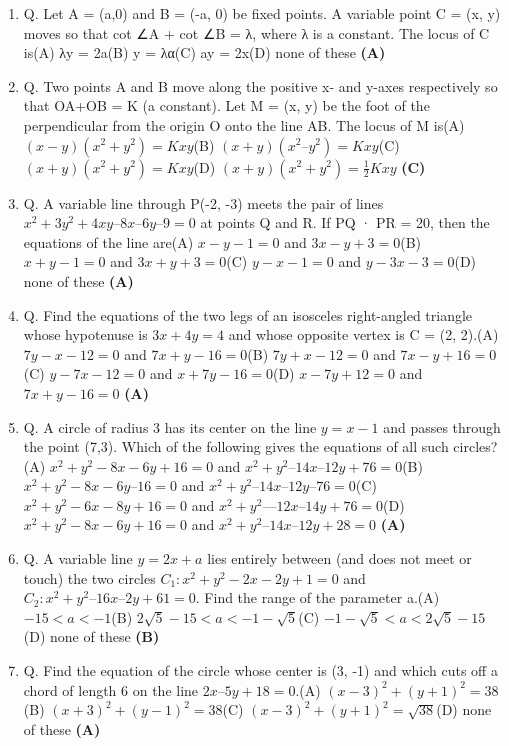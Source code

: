 \documentclass{article}
\begin{document}
\begin{enumerate}
\item Q. Let A = (a,0) and B = (-a, 0) be fixed points. A variable point C = (x, y) moves so that cot ∠A + cot ∠B = λ, where λ is a constant. The locus of C is\n(A) λy = 2a\n(B) y = λα\n(C) ay = 2x\n(D) none of these \hfill \textbf{(A)}
\item Q. Two points A and B move along the positive x- and y-axes respectively so that OA+OB = K (a constant). Let M = (x, y) be the foot of the perpendicular from the origin O onto the line AB. The locus of M is\n(A) $(x - y) (x^2 + y^2) = K xy$\n(B) $(x + y) (x^2 – y^2) = K xy$\n(C) $(x + y) (x^2 + y^2) = K xy$\n(D) $(x + y) (x^2 + y^2) = \frac{1}{2} K xy$ \hfill \textbf{(C)}
\item Q. A variable line through P(-2, -3) meets the pair of lines $x^2 + 3y^2 + 4xy – 8x – 6y – 9 =0$ at points Q and R. If PQ · PR = 20, then the equations of the line are\n(A) $x − y − 1 = 0$ and $3x - y + 3 = 0$\n(B) $x + y − 1 = 0$ and $3x + y + 3 = 0$\n(C) $y − x − 1 = 0$ and $y - 3x-3=0$\n(D) none of these \hfill \textbf{(A)}
\item Q. Find the equations of the two legs of an isosceles right-angled triangle whose hypotenuse is $3x + 4y = 4$ and whose opposite vertex is C = (2, 2).\n(A) $7y - x - 12 = 0$ and $7x + y - 16 = 0$\n(B) $7y + x - 12 = 0$ and $7x - y + 16 = 0$\n(C) $y - 7x - 12 = 0$ and $x + 7y - 16 = 0$\n(D) $x - 7y+ 12 = 0$ and $7x + y - 16 = 0$ \hfill \textbf{(A)}
\item Q. A circle of radius 3 has its center on the line $y = x - 1$ and passes through the point (7,3). Which of the following gives the equations of all such circles?\n(A) $x^2 + y^2 - 8x - 6y + 16 = 0$ and $x^2 + y^2 – 14x – 12y + 76 = 0$\n(B) $x^2 + y^2 - 8x - 6y – 16 = 0$ and $x^2 + y^2 – 14x – 12y – 76 = 0$\n(C) $x^2 + y^2-6x - 8y + 16 = 0$ and $x^2 + y^2 — 12x – 14y + 76 = 0$\n(D) $x^2 + y^2 - 8x - 6y + 16 = 0$ and $x^2 + y^2 – 14x – 12y + 28 = 0$ \hfill \textbf{(A)}
\item Q. A variable line $y = 2x + a$ lies entirely between (and does not meet or touch) the two circles $C_1: x^2 + y^2 - 2x - 2y + 1 = 0$ and $C_2: x^2 + y^2 – 16x – 2y + 61 = 0$. Find the range of the parameter a.\n(A) $-15 < a < -1$\n(B) $2\sqrt{5}-15 < a < -1-\sqrt{5}$\n(C) $-1-\sqrt{5} < a < 2\sqrt{5}-15$\n(D) none of these \hfill \textbf{(B)}
\item Q. Find the equation of the circle whose center is (3, -1) and which cuts off a chord of length 6 on the line $2x – 5y + 18 = 0$.\n(A) $(x - 3)^2 + (y + 1)^2 = 38$\n(B) $(x + 3)^2 + (y − 1)^2 = 38$\n(C) $(x - 3)^2 + (y + 1)^2 = \sqrt{38}$\n(D) none of these \hfill \textbf{(A)}

\end{enumerate}
\end{document}
